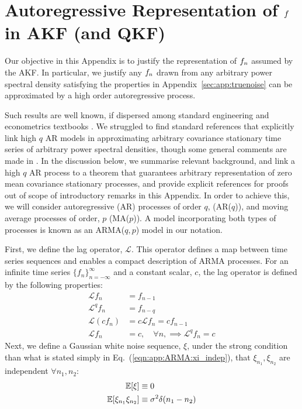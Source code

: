 \clearpage
\section{ Autoregressive Representation of $f$ in AKF (and QKF) \label{sec:app:AKF}}

Our objective in this Appendix is to justify the representation of $f_n$ assumed by the AKF. In particular, we justify any $f_n$ drawn from any arbitrary power spectral density satisfying the properties in Appendix~\ref{sec:app:truenoise} can be approximated by a high order autoregressive process.

Such results are well known, if dispersed among standard engineering and econometrics textbooks \cite{hamilton1994time,brockwell1996introduction,west1996bayesian,harvey1990forecasting,landau1998adaptive,candy2016bayesian}. We struggled to find standard references that explicitly link high $q$ AR models in approximating arbitrary covariance stationary time series of arbitrary power spectral densities, though some general comments are made in \cite{west1996bayesian}. In the discussion below, we summarise relevant background, and link a high $q$ AR process to a theorem that guarantees arbitrary representation of zero mean covariance stationary processes, and provide explicit references for proofs out of scope of introductory remarks in this Appendix. In order to achieve this, we will consider autoregressive (AR) processes of order $q$, (AR($q$)), and  moving average processes of order, $p$ (MA($p$)). A model incorporating both types of processes is known as an ARMA($q,p$) model in our notation. 

First, we define the lag operator, $\mathcal{L}$. This operator defines a map between time series sequences and enables a compact description of ARMA processes. For an infinite time series $\{ f_n \}_{n = -\infty}^{\infty}$ and a constant scalar, $c$, the lag operator is defined by the following properties:
\begin{align}
\mathcal{L} f_n & = f_{n-1} \\
\mathcal{L}^q f_n & = f_{n-q} \\
\mathcal{L}(cf_n) & = c\mathcal{L}f_n = cf_{n-1}  \\
\mathcal{L}f_n & = c, \quad \forall n, \implies \mathcal{L}^q f_n  = c
\end{align}
Next, we define a Gaussian white noise sequence, $\xi$, under the strong condition than what is stated simply in Eq.~(\ref {eqn:app:ARMA:xi_indep}), that $\xi_{n_1}, \xi_{n_2}$ are independent $\forall n_1, n_2 $:
\begin{align}
\mathbb{E}[\xi] &\equiv 0  \\
\mathbb{E}[\xi_{n_1} \xi_{n_2}] &\equiv \sigma^2 \delta(n_1-n_2)\label{eqn:app:ARMA:xi_indep}   
\end{align}

